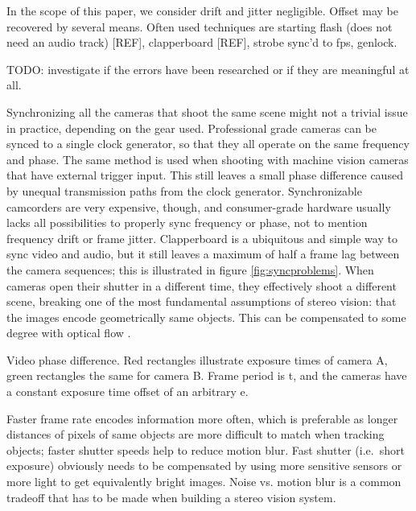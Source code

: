 In the scope of this paper, we consider drift and jitter negligible.
Offset may be recovered by several means.
Often used techniques are starting flash (does not need an audio track) [REF], clapperboard [REF], strobe sync'd to fps, genlock.

TODO: investigate if the errors have been researched or if they are meaningful at all.

Synchronizing all the cameras that shoot the same scene might not a trivial issue in practice, depending on the gear used.
Professional grade cameras can be synced to a single clock generator, so that they all operate on the same frequency and phase.
The same method is used when shooting with machine vision cameras that have external trigger input.
This still leaves a small phase difference caused by unequal transmission paths from the clock generator.
Synchronizable camcorders are very expensive, though, and consumer-grade hardware usually lacks all possibilities to properly sync frequency or phase, not to mention frequency drift or frame jitter.
Clapperboard is a ubiquitous and simple way to sync video and audio, but it still leaves a maximum of half a frame lag between the camera sequences; this is illustrated in figure \ref{fig:syncproblems}.
When cameras open their shutter in a different time, they effectively shoot a different scene, breaking one of the most fundamental assumptions of stereo vision: that the images encode geometrically same objects.
This can be compensated to some degree with optical flow \cite{bradley2009synchronization}.

{Video phase difference.
Red rectangles illustrate exposure times of camera A, green rectangles the same for camera B.
Frame period is t, and the cameras have a constant exposure time offset of an arbitrary e.}

Faster frame rate encodes information more often, which is preferable as longer distances of pixels of same objects are more difficult to match when tracking objects; faster shutter speeds help to reduce motion blur.
Fast shutter (i.e.~short exposure) obviously needs to be compensated by using more sensitive sensors or more light to get equivalently bright images.
Noise vs. motion blur is a common tradeoff that has to be made when building a stereo vision system.

